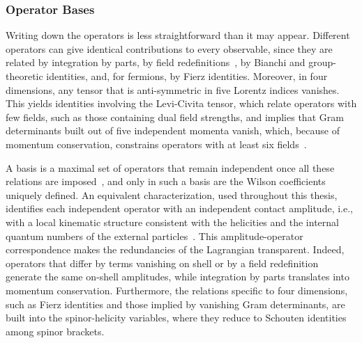 \subsubsection*{Operator Bases}

Writing down the operators is less straightforward than it may appear. Different operators can give
identical contributions to every observable, since they are related by integration by parts, by field
redefinitions~\cite{Politzer:1980me,Georgi:1991ch,Arzt:1993gz,Criado:2018sdb}, by Bianchi and
group-theoretic identities, and, for fermions, by Fierz identities. Moreover, in four dimensions, any
tensor that is anti-symmetric in five Lorentz indices vanishes. This yields identities involving the
Levi-Civita tensor, which relate operators with few fields, such as those containing dual field
strengths, and implies that Gram determinants built out of five independent momenta vanish, which,
because of momentum conservation, constrains operators with at least six
fields~\cite{Henning:2017fpj}. 

A basis is a maximal set of operators that remain independent once
all these relations are imposed~\cite{Lehman:2015via,Henning:2015alf}, and only in such a basis are
the Wilson coefficients uniquely defined. An equivalent characterization, used throughout this
thesis, identifies each independent operator with an independent contact amplitude, i.e., with a
local kinematic structure consistent with the helicities and the internal quantum numbers of the
external
particles~\cite{Shadmi:2018xan,Ma:2019gtx,Durieux:2019eor,Durieux:2020gip,Li:2020gnx,Dong:2021vxo,Li:2022tec}.
This amplitude-operator correspondence makes the redundancies of the Lagrangian transparent. Indeed,
operators that differ by terms vanishing on shell or by a field redefinition generate the same
on-shell amplitudes, while integration by parts translates into momentum conservation. Furthermore,
the relations specific to four dimensions, such as Fierz identities and those implied by vanishing
Gram determinants, are built into the spinor-helicity variables, where they reduce to Schouten
identities among spinor brackets.

